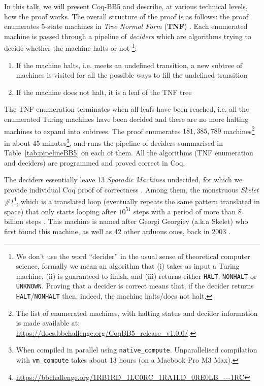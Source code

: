 \documentclass{easychair}
\newcommand{\CoqBB}{Coq-BB5\xspace}
\theoremstyle{definition} %
\numberwithin{equation}{section}
\theoremstyle{definition} %
\begin{document}
In this talk, we will present \CoqBB and describe, at various technical levels, how the proof works. The overall structure of the proof is as follows: the proof enumerates 5-state machines in \textit{Tree Normal Form} (\textbf{TNF}) \cite{Brady64,Brady83,Marxen_1990}. Each enumerated machine is passed through a pipeline of \textit{deciders} which are algorithms trying to decide whether the machine halts or not
\footnote{We don't use the word ``decider'' in the usual sense of theoretical computer science, formally we mean an algorithm that (i) takes as input a Turing machine, (ii) is guaranteed to finish, and (iii) returns either \texttt{HALT}, \texttt{NONHALT} or \texttt{UNKNOWN}. Proving that a decider is correct means that, if the decider returns \texttt{HALT}/\texttt{NONHALT} then, indeed, the machine halts/does not halt.}:
\begin{enumerate}
  \item If the machine halts, i.e. meets an undefined transition, a new subtree of machines is visited for all the possible ways to fill the undefined transition
  \item If the machine does not halt, it is a leaf of the TNF tree
\end{enumerate}
The TNF enumeration terminates when all leafs have been reached, i.e. all the enumerated Turing machines have been decided and there are no more halting machines to expand into subtrees. The proof enumerates $181{,}385{,}789$ machines\footnote{The list of enumerated machines, with halting status and decider information is made available at: \url{https://docs.bbchallenge.org/CoqBB5_release_v1.0.0/}.} in about 45 minutes\footnote{When compiled in parallel using \texttt{native\_compute}. Unparallelised compilation with \texttt{vm\_compute} takes about 13 hours (on a Macbook Pro M3 Max).}, and runs the pipeline of deciders summarised in Table~\ref{tab:pipelineBB5} on each of them. All the algorithms (TNF enumeration and deciders) are programmed and proved correct in Coq.

The deciders essentially leave 13 \textit{Sporadic Machines} undecided, for which we provide individual Coq proof of correctness \cite{busycoq,xu2024skelet17fifthbusy}. Among them, the monstruous \textit{Skelet \#1}\footnote{\url{https://bbchallenge.org/1RB1RD_1LC0RC_1RA1LD_0RE0LB_---1RC}}, which is a translated loop (\ie eventually repeats the same pattern translated in space) that only starts looping after $10^{51}$ steps with a period of more than $8$ billion steps \cite{ShawnSkelet1}. This machine is named after Georgi Georgiev (a.k.a Skelet) who first found this machine, as well as 42 other arduous ones, back in 2003 \cite{Skelet_bbfind}.
\end{document}
